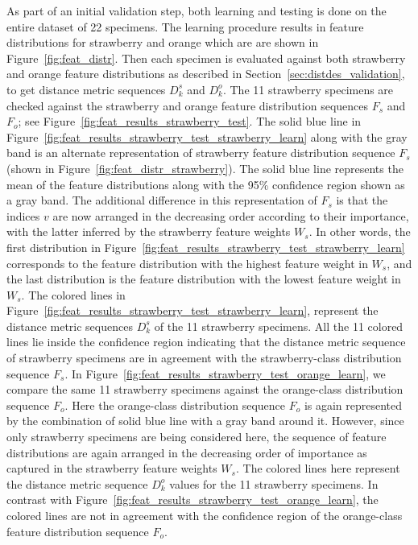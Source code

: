 \documentclass {udthesis}
\begin{document}
As part of an initial validation step, both learning and testing is done on the entire dataset of 22 specimens. The learning procedure
results in feature distributions for strawberry and orange which are are shown in Figure~\ref{fig:feat_distr}. Then each specimen is evaluated against both strawberry and orange feature distributions as described in Section~\ref{sec:distdes_validation}, to get distance metric sequences $D^s_k$ and $D^o_k$. The 11 strawberry specimens are checked against the strawberry and orange feature distribution sequences $F_{s}$ and $F_{o}$; see Figure~\ref{fig:feat_results_strawberry_test}. The solid blue line in Figure~\ref{fig:feat_results_strawberry_test_strawberry_learn} along with the gray band is an alternate representation of strawberry feature distribution sequence $F_{s}$ (shown in Figure~\ref{fig:feat_distr_strawberry}). The solid blue line represents the mean of the feature distributions along with the 95\% confidence region shown as a gray band. The additional difference in this representation of $F_s$ is that the indices $v$ are now arranged in the decreasing order according to their importance, with the 
latter inferred by the strawberry feature weights $W_s$. In other words, the first distribution in Figure~\ref{fig:feat_results_strawberry_test_strawberry_learn} corresponds to the feature distribution with the highest feature weight in $W_{s}$, and the 
last distribution is the 
feature distribution with the lowest feature weight in $W_{s}$. 
The colored lines in Figure~\ref{fig:feat_results_strawberry_test_strawberry_learn}, represent the distance metric sequences $D^s_k$ of the 11 strawberry specimens. 
All the 11 colored lines lie inside the confidence region indicating that the 
distance metric sequence of strawberry specimens are in agreement with the strawberry-class distribution sequence $F_{s}$.
In Figure~\ref{fig:feat_results_strawberry_test_orange_learn}, we compare the same 11 strawberry specimens against the orange-class distribution sequence $F_{o}$. Here the orange-class distribution sequence $F_{o}$ is again represented by the combination of solid blue line with a gray band around it. However, since only strawberry specimens are being considered here, the sequence of feature distributions are again arranged in the decreasing order of importance as captured in the strawberry feature weights $W_s$. The colored lines here represent the distance metric sequence $D^o_k$ values for the 11 strawberry specimens.
In contrast with Figure~\ref{fig:feat_results_strawberry_test_orange_learn}, the colored lines are not in agreement with the confidence region of the orange-class feature distribution sequence $F_{o}$.
\end{document}
